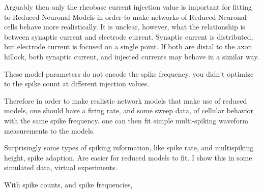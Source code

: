  Arguably then only the rheobase current injection value is important for fitting to Reduced Neuronal Models in order to make networks of Reduced Neuronal cells behave more realistically.
 It is unclear, however, what the relationship is between synaptic current and electrode current. Synaptic current is distributed, but electrode current is focused on a single point.
 If both are distal to the axon hillock, both synaptic current, and injected currents may behave in a similar way.


 These model parameters do not encode the spike frequency.
you didn't optimize to the spike count at different injection values.

Therefore in order to make realistic network models that make use of reduced models, 
one should have a firing rate, and some sweep data, of cellular behavior with the same spike frequency.
one can then fit simple multi-spiking waveform measurements to the models.

Surprisingly some types of spiking information, like spike rate, and multispiking height, spike adaption.
Are easier for reduced models to fit. I show this in some simulated data, virtual experiments.

With spike counts, and spike frequencies, 
